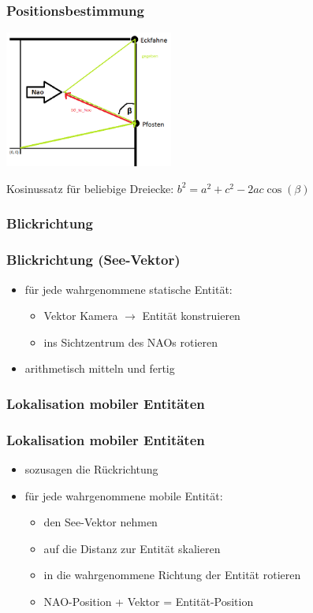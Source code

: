 \frame
{\frametitle{Positionsbestimmung}
\begin{center}\includegraphics[height=4.5cm, center]{Positionsbestimmung.png}\end{center}%
Kosinussatz für beliebige Dreiecke: $b^2 = a^2 + c^2 - 2ac \cos (\beta)$
}

\subsubsection{Blickrichtung}
\frame
{\frametitle{Blickrichtung (See-Vektor)}
\begin{itemize}
    \item für jede wahrgenommene statische Entität:
	\begin{itemize}
	    \item Vektor Kamera $\rightarrow$ Entität konstruieren
	    \item ins Sichtzentrum des NAOs rotieren
	\end{itemize}
    \item arithmetisch mitteln und fertig
\end{itemize}
}

\subsubsection{Lokalisation mobiler Entitäten}
\frame
{\frametitle{Lokalisation mobiler Entitäten}
\begin{itemize}
    \item sozusagen die Rückrichtung
    \item für jede wahrgenommene mobile Entität:
	\begin{itemize}
	    \item den See-Vektor nehmen
        \item auf die Distanz zur Entität skalieren
        \item in die wahrgenommene Richtung der Entität rotieren
        \item NAO-Position + Vektor = Entität-Position
	\end{itemize}
\end{itemize}
}

